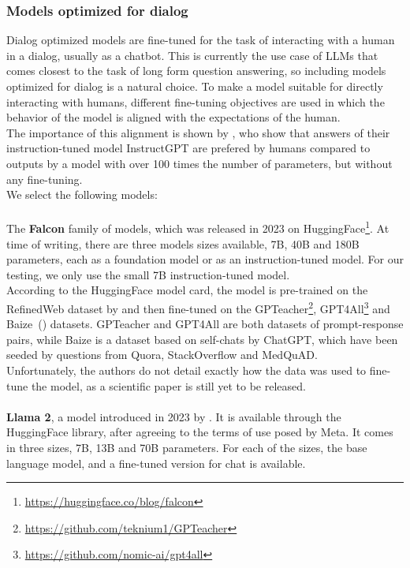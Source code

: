 \subsubsection{Models optimized for dialog}\label{sec:dialog-models}
Dialog optimized models are fine-tuned for the task of interacting with a human in a dialog, usually as a chatbot.
This is currently the use case of LLMs that comes closest to the task of long form question answering, so including models optimized for dialog is a natural choice.
To make a model suitable for directly interacting with humans, different fine-tuning objectives are used in which the behavior of the model is aligned with the expectations of the human.
\\
The importance of this alignment is shown by \cite{ouyang:2022:Training}, who show that answers of their instruction-tuned model InstructGPT are prefered by humans compared to outputs by a model with over 100 times the number of parameters, but without any fine-tuning.
\\
We select the following models:
\\\\
The \textbf{Falcon} family of models, which was released in 2023 on HuggingFace\footnote{\url{https://huggingface.co/blog/falcon}}.
At time of writing, there are three models sizes available, 7B, 40B and 180B parameters, each as a foundation model or as an instruction-tuned model.
For our testing, we only use the small 7B instruction-tuned model.
\\
According to the HuggingFace model card, the model is pre-trained on the RefinedWeb dataset by \cite{penedo:2023:The} and then fine-tuned on the GPTeacher\footnote{\url{https://github.com/teknium1/GPTeacher}}, GPT4All\footnote{\url{https://github.com/nomic-ai/gpt4all}} and Baize~(\cite{xu:2023:Baize}) datasets.
GPTeacher and GPT4All are both datasets of prompt-response pairs, while Baize is a dataset based on self-chats by ChatGPT, which have been seeded by questions from Quora, StackOverflow and MedQuAD.
\\
Unfortunately, the authors do not detail exactly how the data was used to fine-tune the model, as a scientific paper is still yet to be released.
\\
\\
\textbf{Llama 2}, a model introduced in 2023 by \cite{touvron:2023:Llama}.
It is available through the HuggingFace library, after agreeing to the terms of use posed by Meta.
It comes in three sizes, 7B, 13B and 70B parameters.
For each of the sizes, the base language model, and a fine-tuned version for chat is available.
